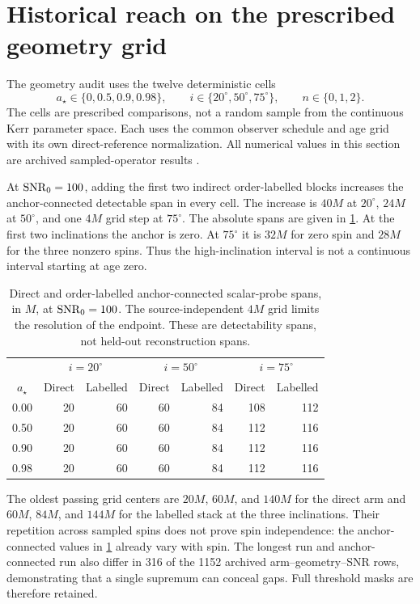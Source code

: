 \section{Historical reach on the prescribed geometry grid}\label{sec:reach}
The geometry audit uses the twelve deterministic cells
\begin{equation}
a_\star\in\{0,0.5,0.9,0.98\},\qquad
 i\in\{20^\circ,50^\circ,75^\circ\},\qquad n\in\{0,1,2\}.
\label{eq:geometrygrid}
\end{equation}
The cells are prescribed comparisons, not a random sample from the continuous Kerr parameter space. Each uses the common observer schedule and age grid with its own direct-reference normalization. All numerical values in this section are archived sampled-operator results \cite{archive}.

At $\mathrm{SNR}_0=100$, adding the first two indirect order-labelled blocks increases the anchor-connected detectable span in every cell. The increase is $40M$ at $20^\circ$, $24M$ at $50^\circ$, and one $4M$ grid step at $75^\circ$. The absolute spans are given in \cref{tab:reach}. At the first two inclinations the anchor is zero. At $75^\circ$ it is $32M$ for zero spin and $28M$ for the three nonzero spins. Thus the high-inclination interval is not a continuous interval starting at age zero.

\begin{table}[htbp]
\centering\small
\caption{Direct and order-labelled anchor-connected scalar-probe spans, in $M$, at $\mathrm{SNR}_0=100$. The source-independent $4M$ grid limits the resolution of the endpoint. These are detectability spans, not held-out reconstruction spans.}
\label{tab:reach}
\begin{tabular}{c rr rr rr}
\toprule
&\multicolumn{2}{c}{$i=20^\circ$}&\multicolumn{2}{c}{$i=50^\circ$}&\multicolumn{2}{c}{$i=75^\circ$}\\
$a_\star$&Direct&Labelled&Direct&Labelled&Direct&Labelled\\
\midrule
0.00&20&60&60&84&108&112\\
0.50&20&60&60&84&112&116\\
0.90&20&60&60&84&112&116\\
0.98&20&60&60&84&112&116\\
\bottomrule
\end{tabular}
\end{table}

The oldest passing grid centers are $20M$, $60M$, and $140M$ for the direct arm and $60M$, $84M$, and $144M$ for the labelled stack at the three inclinations. Their repetition across sampled spins does not prove spin independence: the anchor-connected values in \cref{tab:reach} already vary with spin. The longest run and anchor-connected run also differ in 316 of the 1152 archived arm--geometry--SNR rows, demonstrating that a single supremum can conceal gaps. Full threshold masks are therefore retained.

